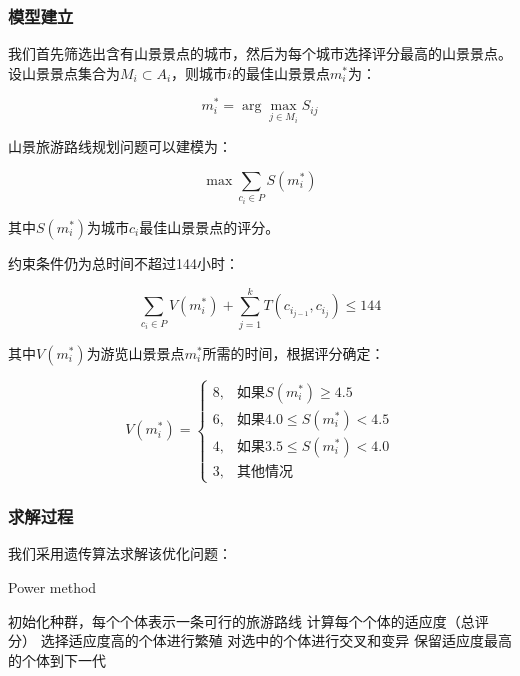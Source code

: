 \documentclass[withoutpreface,bwprint]{cumcmthesis} %
\begin{document}
\subsubsection{模型建立}
我们首先筛选出含有山景景点的城市，然后为每个城市选择评分最高的山景景点。设山景景点集合为$M_i \subset A_i$，则城市$i$的最佳山景景点$m_i^*$为：

\begin{equation}
m_i^* = \arg\max_{j \in M_i} S_{ij}
\end{equation}

山景旅游路线规划问题可以建模为：

\begin{equation}
\max \sum_{c_i \in P} S(m_i^*)
\end{equation}

其中$S(m_i^*)$为城市$c_i$最佳山景景点的评分。

约束条件仍为总时间不超过144小时：

\begin{equation}
\sum_{c_i \in P} V(m_i^*) + \sum_{j=1}^{k} T(c_{i_{j-1}}, c_{i_j}) \leq 144
\end{equation}

其中$V(m_i^*)$为游览山景景点$m_i^*$所需的时间，根据评分确定：

\begin{equation}
V(m_i^*) = \begin{cases}
8, & \text{如果$S(m_i^*) \geq 4.5$} \\
6, & \text{如果$4.0 \leq S(m_i^*) < 4.5$} \\
4, & \text{如果$3.5 \leq S(m_i^*) < 4.0$} \\
3, & \text{其他情况}
\end{cases}
\end{equation}

\subsubsection{求解过程}
我们采用遗传算法求解该优化问题：

\begin{algorithm}[!ht]
    \renewcommand{\algorithmicrequire}{\textbf{Input:}}
	\renewcommand{\algorithmicensure}{\textbf{Output:}}
	\caption{Power method}
    \label{power}
    \begin{algorithmic}[1] %
\STATE 初始化种群，每个个体表示一条可行的旅游路线
    \STATE 计算每个个体的适应度（总评分）
    \STATE 选择适应度高的个体进行繁殖
    \STATE 对选中的个体进行交叉和变异
    \STATE 保留适应度最高的个体到下一代
\ENDFOR
\end{algorithmic}
\end{algorithm}
\end{document}
